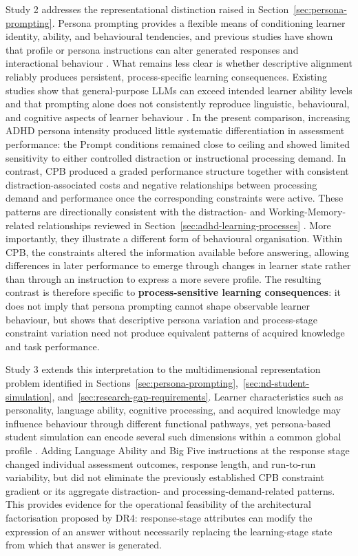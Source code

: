 Study 2 addresses the representational distinction raised in Section~\ref{sec:persona-prompting}. Persona prompting provides a flexible means of conditioning learner identity, ability, and behavioural tendencies, and previous studies have shown that profile or persona instructions can alter generated responses and interactional behaviour \cite{benedetto-etal-2024-using,liu-etal-2024-personality}. What remains less clear is whether descriptive alignment reliably produces persistent, process-specific learning consequences. Existing studies show that general-purpose LLMs can exceed intended learner ability levels and that prompting alone does not consistently reproduce linguistic, behavioural, and cognitive aspects of learner behaviour \cite{wu-etal-2025-embracing,scarlatos-etal-2026-simulated}. In the present comparison, increasing ADHD persona intensity produced little systematic differentiation in assessment performance: the Prompt conditions remained close to ceiling and showed limited sensitivity to either controlled distraction or instructional processing demand. In contrast, CPB produced a graded performance structure together with consistent distraction-associated costs and negative relationships between processing demand and performance once the corresponding constraints were active. These patterns are directionally consistent with the distraction- and Working-Memory-related relationships reviewed in Section~\ref{sec:adhd-learning-processes} \cite{pelham-etal-2011-distractors,kofler2010adhd,sweller-etal-2019-cognitive}. More importantly, they illustrate a different form of behavioural organisation. Within CPB, the constraints altered the information available before answering, allowing differences in later performance to emerge through changes in learner state rather than through an instruction to express a more severe profile. The resulting contrast is therefore specific to \textbf{process-sensitive learning consequences}: it does not imply that persona prompting cannot shape observable learner behaviour, but shows that descriptive persona variation and process-stage constraint variation need not produce equivalent patterns of acquired knowledge and task performance.

Study 3 extends this interpretation to the multidimensional representation problem identified in Sections~\ref{sec:persona-prompting},~\ref{sec:nd-student-simulation}, and~\ref{sec:research-gap-requirements}. Learner characteristics such as personality, language ability, cognitive processing, and acquired knowledge may influence behaviour through different functional pathways, yet persona-based student simulation can encode several such dimensions within a common global profile \cite{liu-etal-2024-personality}. Adding Language Ability and Big Five instructions at the response stage changed individual assessment outcomes, response length, and run-to-run variability, but did not eliminate the previously established CPB constraint gradient or its aggregate distraction- and processing-demand-related patterns. This provides evidence for the operational feasibility of the architectural factorisation proposed by DR4: response-stage attributes can modify the expression of an answer without necessarily replacing the learning-stage state from which that answer is generated.

